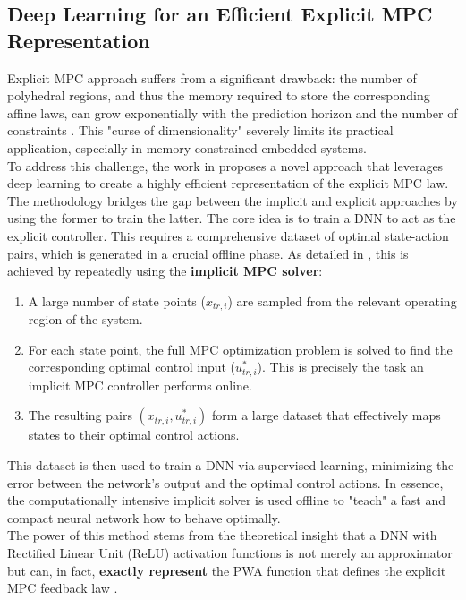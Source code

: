 \subsection{Deep Learning for an Efficient Explicit MPC Representation}

Explicit MPC approach suffers from a significant drawback: the number of polyhedral regions, and thus the memory required to store the corresponding affine laws, can grow exponentially with the prediction horizon and the number of constraints . This "curse of dimensionality" severely limits its practical application, especially in memory-constrained embedded systems\cite{karg2020efficient}.
\\
\noindent
To address this challenge, the work in \cite{karg2020efficient} proposes a novel approach that leverages deep learning to create a highly efficient representation of the explicit MPC law. The methodology bridges the gap between the implicit and explicit approaches by using the former to train the latter.
The core idea is to train a DNN to act as the explicit controller. This requires a comprehensive dataset of optimal state-action pairs, which is generated in a crucial offline phase. As detailed in \cite{karg2020efficient}, this is achieved by repeatedly using the \textbf{implicit MPC solver}:
\begin{enumerate}
    \item A large number of state points ($x_{tr,i}$) are sampled from the relevant operating region of the system.
    \item For each state point, the full MPC optimization problem is solved to find the corresponding optimal control input ($u^*_{tr,i}$). This is precisely the task an implicit MPC controller performs online.
    \item The resulting pairs $(x_{tr,i}, u^*_{tr,i})$ form a large dataset that effectively maps states to their optimal control actions.
\end{enumerate}
This dataset is then used to train a DNN via supervised learning, minimizing the error between the network's output and the optimal control actions. In essence, the computationally intensive implicit solver is used offline to "teach" a fast and compact neural network how to behave optimally.
\\
\noindent
The power of this method stems from the theoretical insight that a DNN with Rectified Linear Unit (ReLU) activation functions is not merely an approximator but can, in fact, \textbf{exactly represent} the PWA function that defines the explicit MPC feedback law \cite{karg2020efficient}.
